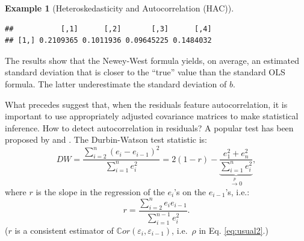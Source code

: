 \documentclass[
  12pt,
]{book}
\newenvironment{Shaded}{\begin{snugshade}}{\end{snugshade}}
\newcommand{\CommentTok}[1]{\textcolor[rgb]{0.56,0.35,0.01}{\textit{#1}}}
\newcommand{\DecValTok}[1]{\textcolor[rgb]{0.00,0.00,0.81}{#1}}
\newcommand{\FunctionTok}[1]{\textcolor[rgb]{0.00,0.00,0.00}{#1}}
\newcommand{\NormalTok}[1]{#1}
\newcommand{\OtherTok}[1]{\textcolor[rgb]{0.56,0.35,0.01}{#1}}
\newcommand{\SpecialCharTok}[1]{\textcolor[rgb]{0.00,0.00,0.00}{#1}}
\theoremstyle{definition}
\theoremstyle{definition}
\newtheorem{example}{Example}[chapter]
\theoremstyle{definition}
\theoremstyle{definition}
\theoremstyle{remark}
\begin{document}
\begin{example}[Heteroskedasticity and Autocorrelation (HAC)]
\begin{Shaded}
\end{Shaded}

\begin{verbatim}
##           [,1]      [,2]       [,3]      [,4]
## [1,] 0.2109365 0.1011936 0.09645225 0.1484032
\end{verbatim}

The results show that the Newey-West formula yields, on average, an estimated standard deviation that is closer to the ``true'' value than the standard OLS formula. The latter underestimate the standard deviation of \(b\).
\end{example}

What precedes suggest that, when the residuals feature autocorrelation, it is important to use appropriately adjusted covariance matrices to make statistical inference. How to detect autocorrelation in residuals? A popular test has been proposed by \citet{Durbin_Watson_1950} and \citet{Durbin_Watson_1951}. The Durbin-Watson test statistic is:
\[
DW = \frac{\sum_{i=2}^{n}(e_i - e_{i-1})^2}{\sum_{i=1}^{n}e_i^2}= 2(1 - r) - \underbrace{\frac{e_1^2 + e_n^2}{\sum_{i=1}^{n}e_i^2}}_{\overset{p}{\rightarrow} 0},
\]
where \(r\) is the slope in the regression of the \(e_i\)'s on the \(e_{i-1}\)'s, i.e.:
\[
r = \frac{\sum_{i=2}^{n}e_i e_{i-1}}{\sum_{i=1}^{n-1}e_i^2}.
\]
(\(r\) is a consistent estimator of \(\mathbb{C}or(\varepsilon_i,\varepsilon_{i-1})\), i.e.~\(\rho\) in Eq. \eqref{eq:usual2}.)
\end{document}
